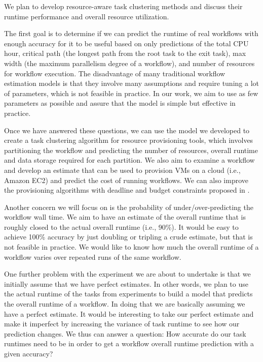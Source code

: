 We plan to develop resource-aware task clustering methods and discuss their runtime performance and overall resource utilization. 

The first goal is to determine if we can predict the runtime of real workflows with enough accuracy for it to be useful based on only predictions of the total CPU hour, critical path (the longest path from the root task to the exit task), max width (the maximum parallelism degree of a workflow), and number of resources for workflow execution. The disadvantage of many traditional workflow estimation models is that they involve many assumptions and require tuning a lot of parameters, which is not feasible in practice. In our work, we aim to use as few parameters as possible and assure that the model is simple but effective in practice. 

Once we have answered these questions, we can use the model we developed to create a task clustering algorithm for resource provisioning tools, which involves partitioning the workflow and predicting the number of resources, overall runtime and data storage required for each partition. We also aim to examine a workflow and develop an estimate that can be used to provision VMs on a cloud (i.e., Amazon EC2) and predict the cost of running workflows. We can also improve the provisioning algorithms with deadline and budget constraints proposed in \cite{Malawski2012}.

Another concern we will focus on is the probability of under/over-predicting the workflow wall time. We aim to have an estimate of the overall runtime that is roughly closed to the actual overall runtime (i.e., 90\%). It would be easy to achieve 100\% accuracy by just doubling or tripling a crude estimate, but that is not feasible in practice. We would like to know how much the overall runtime of a workflow varies over repeated runs of the same workflow.

One further problem with the experiment we are about to undertake is that we initially assume that we have perfect estimates. In other words, we plan to use the actual runtime of the tasks from experiments to build a model that predicts the overall runtime of a workflow. In doing that we are basically assuming we have a perfect estimate. It would be interesting to take our perfect estimate and make it imperfect by increasing the variance of task runtime to see how our prediction changes. We thus can answer a question: How accurate do our task runtimes need to be in order to get a workflow overall runtime prediction with a given accuracy?

